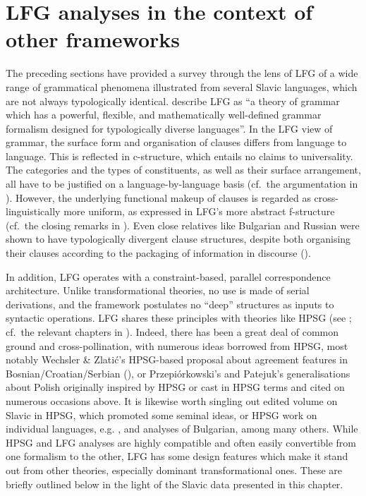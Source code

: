 \documentclass[output=paper,hidelinks]{langscibook}
\begin{document}
          
\section{LFG analyses in the context of other frameworks}
\label{sec:Slavic:3}

The preceding sections have provided a survey through the lens of LFG of a wide range of grammatical phenomena illustrated from several Slavic languages, which are not always typologically identical. \citet[xi]{BresnanEtAl2016} describe LFG as ``a theory of grammar which has a powerful, flexible, and mathematically well-defined grammar formalism designed for typologically diverse languages''. In the LFG view of grammar, the surface form and organisation of clauses differs from language to language. This is reflected in c-structure, which entails no claims to universality. The categories and the types of constituents, as well as their surface arrangement, all have to be justified on a language-by-language basis (cf.\ the argumentation in ). However, the underlying functional makeup of clauses is regarded as cross-linguistically more uniform, as expressed in LFG's more abstract f-structure (cf.\ the closing remarks in ). Even close relatives like Bulgarian and Russian were shown to have typologically divergent clause structures, despite both organising their clauses according to the packaging of information in discourse ().

In addition, LFG operates with a constraint{}-based, parallel correspondence architecture. Unlike transformational theories, no use is made of serial derivations, and the framework postulates no ``deep'' structures as inputs to syntactic operations. LFG shares these principles with theories like HPSG (see ;  cf.\ the relevant chapters in \citealt{BergerGutschmidtKempgenKosta2009}). Indeed, there has been a great deal of common ground and cross-pollination, with numerous ideas borrowed from HPSG, most notably Wechsler \& Zlati\'{c}'s HPSG-based proposal about agreement features in Bosnian/Croatian/Serbian (), or Przepi{\'o}rkowski's and Patejuk's generalisations about Polish originally inspired by HPSG or cast in HPSG terms and cited on numerous occasions above. It is likewise worth singling out  edited volume on Slavic in HPSG, which promoted some seminal ideas, or HPSG work on individual languages, e.g. ,  and  analyses of Bulgarian, among many others. While HPSG and LFG analyses are highly compatible and often easily convertible from one formalism to the other, LFG has some design features which make it stand out from other theories, especially dominant transformational ones. These are briefly outlined below in the light of the Slavic data presented in this chapter.
\end{document}
